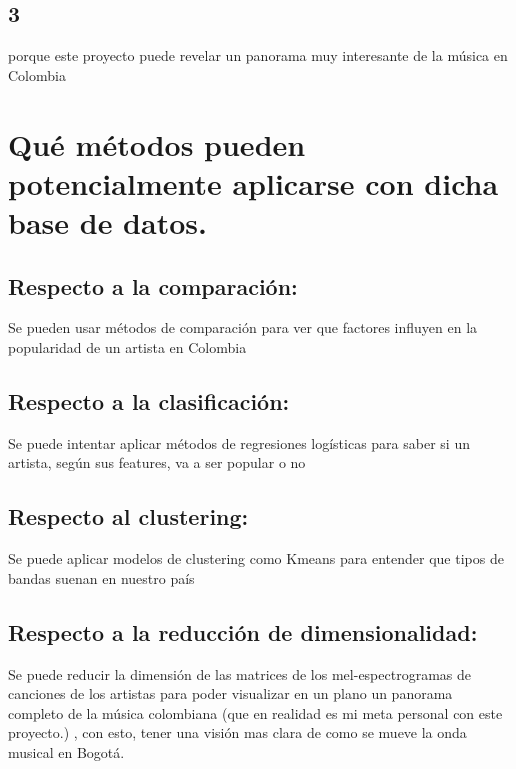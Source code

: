 \documentclass[11pt]{article}
\begin{document}
\subsection{3}
\label{sec:org9e7db43}
porque este proyecto puede revelar un panorama muy interesante de la música en Colombia

\section{Qué métodos pueden potencialmente aplicarse con dicha base de datos.}
\label{sec:orgec54276}
\subsection{Respecto a la comparación:}
\label{sec:org6b34803}
Se pueden usar métodos de comparación para ver que factores influyen en la popularidad de un artista en Colombia
\subsection{Respecto a la clasificación:}
\label{sec:org472cf74}
Se puede intentar aplicar métodos de regresiones logísticas para saber si un artista, según sus features, va a ser popular o no
\subsection{Respecto al clustering:}
\label{sec:orge6254d7}
Se puede aplicar modelos de clustering como Kmeans para entender que tipos de bandas suenan en nuestro país
\subsection{Respecto a la reducción de dimensionalidad:}
\label{sec:orgaca0c0f}
Se puede reducir la dimensión de las matrices de los mel-espectrogramas de
canciones de los artistas para poder visualizar en un plano un panorama completo de la música
colombiana (que en realidad es mi meta personal con este proyecto.) , con esto,
tener una visión mas clara de como se mueve la onda musical en Bogotá.
\end{document}
